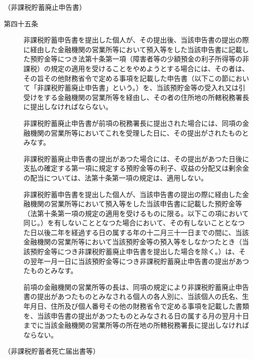 \documentclass[twocolumn,a4j,10pt]{ltjtarticle}
\begin{document}
\noindent\hspace{10pt}（非課税貯蓄廃止申告書）
\begin{description}
\item[第四十五条]非課税貯蓄申告書を提出した個人が、その提出後、当該申告書の提出の際に経由した金融機関の営業所等において預入等をした当該申告書に記載した預貯金等につき法第十条第一項（障害者等の少額預金の利子所得等の非課税）の規定の適用を受けることをやめようとする場合には、その者は、その旨その他財務省令で定める事項を記載した申告書（以下この節において「非課税貯蓄廃止申告書」という。）を、当該預貯金等の受入れ又は引受けをする金融機関の営業所等を経由し、その者の住所地の所轄税務署長に提出しなければならない。
\item[]非課税貯蓄廃止申告書が前項の税務署長に提出された場合には、同項の金融機関の営業所等においてこれを受理した日に、その提出がされたものとみなす。
\item[]非課税貯蓄廃止申告書の提出があつた場合には、その提出があつた日後に支払の確定する第一項に規定する預貯金等の利子、収益の分配又は剰余金の配当については、法第十条第一項の規定は、適用しない。
\item[]非課税貯蓄申告書を提出した個人が、当該申告書の提出の際に経由した金融機関の営業所等において預入等をした当該申告書に記載した預貯金等（法第十条第一項の規定の適用を受けるものに限る。以下この項において同じ。）を有しないこととなつた場合において、その有しないこととなつた日以後二年を経過する日の属する年の十二月三十一日までの間に、当該金融機関の営業所等において当該預貯金等の預入等をしなかつたとき（当該預貯金等につき非課税貯蓄廃止申告書を提出した場合を除く。）は、その翌年一月一日に当該預貯金等につき非課税貯蓄廃止申告書の提出があつたものとみなす。
\item[]前項の金融機関の営業所等の長は、同項の規定により非課税貯蓄廃止申告書の提出があつたものとみなされる個人の各人別に、当該個人の氏名、生年月日、住所及び個人番号その他の財務省令で定める事項を記載した書類を、当該申告書の提出があつたものとみなされる日の属する月の翌月十日までに当該金融機関の営業所等の所在地の所轄税務署長に提出しなければならない。
\end{description}
\noindent\hspace{10pt}（非課税貯蓄者死亡届出書等）
\end{document}
